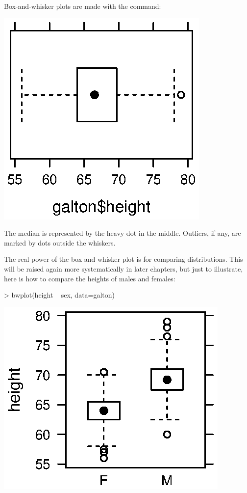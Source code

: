 Box-and-whisker plots are made with the  command:
\begin{Schunk}
\end{Schunk}
\includegraphics{Figures/variation-var6-bw}

The median is represented by the heavy dot in the middle.  Outliers,
if any, are marked by dots outside the whiskers.

The real power of the box-and-whisker plot is for comparing
distributions.  This will be raised again more systematically in later
chapters, but just to illustrate, here is how to compare the heights
of males and females:

\begin{Schunk}
\begin{Sinput}
> bwplot(height ~ sex, data=galton)
\end{Sinput}
\end{Schunk}
\includegraphics{Figures/variation-var7-bw}

